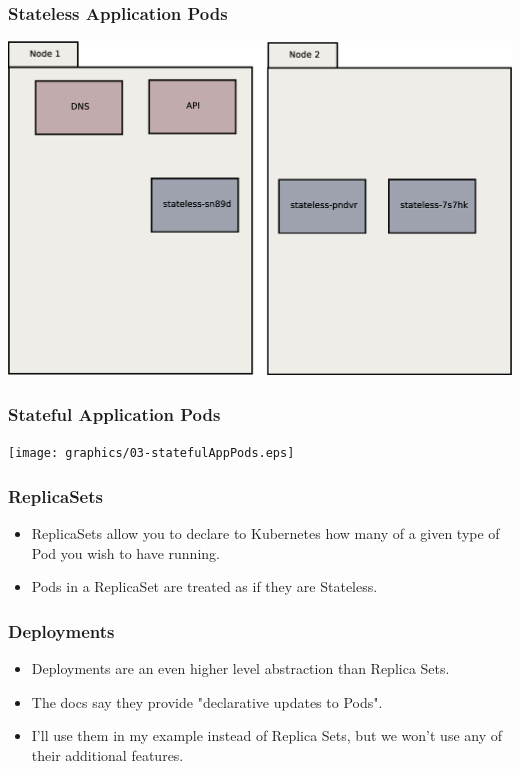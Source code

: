 \documentclass{beamer}
\begin{document}
\begin{frame}
    \frametitle{Stateless Application Pods}
    \includegraphics[width=\textwidth,height=0.85\textheight,keepaspectratio]{graphics/02-statelessAppPods.eps}
\end{frame}

\begin{frame}
    \frametitle{Stateful Application Pods}
    \texttt{[image: graphics/03-statefulAppPods.eps]}
\end{frame}

\begin{frame}
\frametitle{ReplicaSets}
\begin{itemize}    
    \item ReplicaSets allow you to declare to Kubernetes how many of a given type of Pod you wish to have running.
    \item Pods in a ReplicaSet are treated as if they are Stateless.
\end{itemize}
\end{frame}

\begin{frame}
    \frametitle{Deployments}
    \begin{itemize}
        \item Deployments are an even higher level abstraction than Replica Sets.
        \item The docs say they provide "declarative updates to Pods".
        \item I'll use them in my example instead of Replica Sets, but we won't use any of their additional features.
    \end{itemize}
\end{frame}
\end{document}
